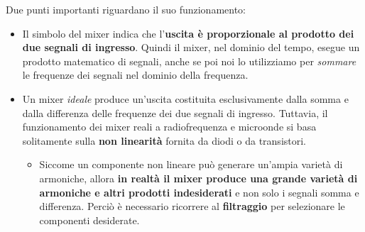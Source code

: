 \documentclass[openany,a4paper,12pt]{book}
\begin{document}
\begin{figure}[H]
    \centering
\end{figure}

Due punti importanti riguardano il suo funzionamento:
\begin{itemize}[label=\textcolor{PoliBlue}{\textbullet}]
    \item Il simbolo del mixer indica che l'\textbf{uscita è proporzionale al prodotto dei due segnali di ingresso}. Quindi il mixer, nel dominio del tempo, esegue un prodotto matematico di segnali, anche se poi noi lo utilizziamo per \textit{sommare} le frequenze dei segnali nel dominio della frequenza.
    \item Un mixer \textit{ideale} produce un'uscita costituita esclusivamente dalla somma e dalla differenza delle frequenze dei due segnali di ingresso. Tuttavia, il funzionamento dei mixer reali a radiofrequenza e microonde si basa solitamente sulla \textbf{non linearità} fornita da diodi o da transistori.
    \begin{itemize}[label=$\circ$]
        \item Siccome un componente non lineare può generare un'ampia varietà di armoniche, allora \textbf{in realtà il mixer produce una grande varietà di armoniche e altri prodotti indesiderati} e non solo i segnali somma e differenza. Perciò è necessario ricorrere al \textbf{filtraggio} per selezionare le componenti desiderate.
    \end{itemize}
\end{itemize}
\end{document}
